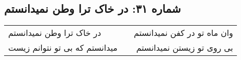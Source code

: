 \begin{center}
\section*{شماره ۳۱: در خاک ترا وطن نمیدانستم}
\label{sec:031}
\begin{longtable}{l p{0.5cm} r}
در خاک ترا وطن نمیدانستم
&&
وان ماه تو در کفن نمیدانستم
\\
میدانستم که بی تو نتوانم زیست
&&
بی روی تو زیستن نمیدانستم
\\
\end{longtable}
\end{center}
